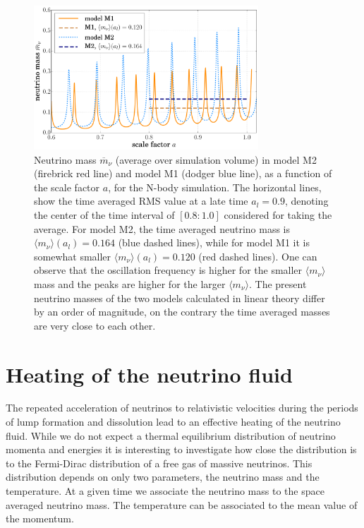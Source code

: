 \begin{figure}
\begin{centering}
\includegraphics[width=0.75\textwidth]{Chapters/gnq/figures/Background-model1model-model2-gnq_mnu-v1} 
\par\end{centering}
\caption[Neutrino mass $\overline{m}_{\nu}$
in model M2 and M1 of GNQ.]{\textbf{\label{fig:NuMass-mod2}}Neutrino mass $\overline{m}_{\nu}$
(average over simulation volume) in model M2 (firebrick red line)
and model M1 (dodger blue line), as a function of the scale factor
$a$, for the N-body simulation. The horizontal lines, show the time
averaged RMS value at a late time $a_{l}=0.9$, denoting the center
of the time interval of $[0.8:1.0]$ considered for taking the average.
For model M2, the time averaged neutrino mass is $\langle m_{\nu}\rangle(a_{l})=0.164$
(blue dashed lines), while for model M1 it is somewhat smaller $\langle m_{\nu}\rangle(a_{l})=0.120$
(red dashed lines). One can observe that the oscillation frequency
is higher for the smaller $\langle m_{\nu}\rangle$ mass and the peaks
are higher for the larger $\langle m_{\nu}\rangle$. The present neutrino
masses of the two models calculated in linear theory differ by an
order of magnitude, on the contrary the time averaged masses are very
close to each other. }
\end{figure}



\section{Heating of the neutrino fluid \label{sec:heating-of-the-neutrino}}

The repeated acceleration of neutrinos to relativistic velocities
during the periods of lump formation and dissolution lead to an effective
heating of the neutrino fluid. While we do not expect a thermal equilibrium
distribution of neutrino momenta and energies it is interesting to
investigate how close the distribution is to the Fermi-Dirac distribution
of a free gas of massive neutrinos. This distribution depends on only
two parameters, the neutrino mass and the temperature. At a given
time we associate the neutrino mass to the space averaged neutrino
mass. The temperature can be associated to the mean value of the momentum.

